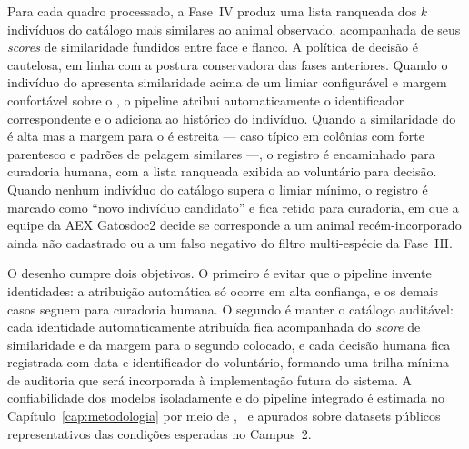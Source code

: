 Para cada quadro processado, a Fase~IV produz uma lista ranqueada dos \(k\) indivíduos do catálogo mais similares ao animal observado, acompanhada de seus \emph{scores} de similaridade fundidos entre face e flanco. A política de decisão é cautelosa, em linha com a postura conservadora das fases anteriores. Quando o indivíduo do  apresenta similaridade acima de um limiar configurável e margem confortável sobre o , o pipeline atribui automaticamente o identificador correspondente e o adiciona ao histórico do indivíduo. Quando a similaridade do  é alta mas a margem para o  é estreita --- caso típico em colônias com forte parentesco e padrões de pelagem similares ---, o registro é encaminhado para curadoria humana, com a lista ranqueada exibida ao voluntário para decisão. Quando nenhum indivíduo do catálogo supera o limiar mínimo, o registro é marcado como ``novo indivíduo candidato'' e fica retido para curadoria, em que a equipe da AEX Gatosdoc2 decide se corresponde a um animal recém-incorporado ainda não cadastrado ou a um falso negativo do filtro multi-espécie da Fase~III.

O desenho cumpre dois objetivos. O primeiro é evitar que o pipeline invente identidades: a atribuição automática só ocorre em alta confiança, e os demais casos seguem para curadoria humana. O segundo é manter o catálogo auditável: cada identidade automaticamente atribuída fica acompanhada do \emph{score} de similaridade e da margem para o segundo colocado, e cada decisão humana fica registrada com data e identificador do voluntário, formando uma trilha mínima de auditoria que será incorporada à implementação futura do sistema. A confiabilidade dos modelos isoladamente e do pipeline integrado é estimada no Capítulo~\ref{cap:metodologia} por meio de \mAP, \Fscore~e  apurados sobre datasets públicos representativos das condições esperadas no Campus~2.

